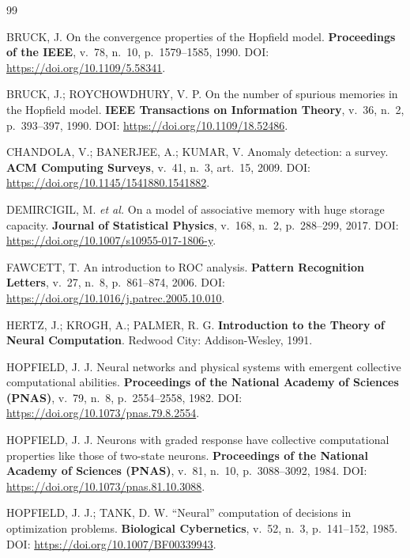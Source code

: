 \clearpage
{}
{}
\begin{thebibliography}{99}
\setlength{\itemsep}{3pt}

 BRUCK, J. On the convergence properties of the Hopfield model.
\textbf{Proceedings of the IEEE}, v.~78, n.~10, p.~1579--1585, 1990.
DOI: \url{https://doi.org/10.1109/5.58341}.

 BRUCK, J.; ROYCHOWDHURY, V. P. On the number of spurious memories in the
Hopfield model. \textbf{IEEE Transactions on Information Theory}, v.~36, n.~2, p.~393--397, 1990.
DOI: \url{https://doi.org/10.1109/18.52486}.

 CHANDOLA, V.; BANERJEE, A.; KUMAR, V. Anomaly detection: a survey.
\textbf{ACM Computing Surveys}, v.~41, n.~3, art.~15, 2009.
DOI: \url{https://doi.org/10.1145/1541880.1541882}.

 DEMIRCIGIL, M. \textit{et al.} On a model of associative memory with huge storage
capacity. \textbf{Journal of Statistical Physics}, v.~168, n.~2, p.~288--299, 2017.
DOI: \url{https://doi.org/10.1007/s10955-017-1806-y}.

 FAWCETT, T. An introduction to ROC analysis. \textbf{Pattern Recognition Letters},
v.~27, n.~8, p.~861--874, 2006. DOI: \url{https://doi.org/10.1016/j.patrec.2005.10.010}.

 HERTZ, J.; KROGH, A.; PALMER, R. G. \textbf{Introduction to the Theory of Neural
Computation}. Redwood City: Addison-Wesley, 1991.

 HOPFIELD, J. J. Neural networks and physical systems with emergent collective
computational abilities. \textbf{Proceedings of the National Academy of Sciences (PNAS)}, v.~79, n.~8,
p.~2554--2558, 1982. DOI: \url{https://doi.org/10.1073/pnas.79.8.2554}.

 HOPFIELD, J. J. Neurons with graded response have collective computational properties
like those of two-state neurons. \textbf{Proceedings of the National Academy of Sciences (PNAS)}, v.~81,
n.~10, p.~3088--3092, 1984. DOI: \url{https://doi.org/10.1073/pnas.81.10.3088}.

 HOPFIELD, J. J.; TANK, D. W. ``Neural'' computation of decisions in optimization
problems. \textbf{Biological Cybernetics}, v.~52, n.~3, p.~141--152, 1985.
DOI: \url{https://doi.org/10.1007/BF00339943}.


\end{thebibliography}
